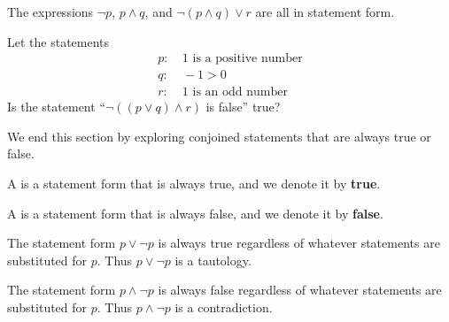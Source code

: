 \begin{example}
    The expressions $\lnot p$, $p \land q$, and $\lnot(p \land q) \lor r$ are all in statement form.
\end{example}

\begin{exercise}
    Let the statements
    \begin{align*}
        p: &\ \text{1 is a positive number}\\
        q: &\ -1 > 0\\
        r: &\ \text{1 is an odd number}
    \end{align*}
    Is the statement ``$\lnot((p\lor q)\land r)$ is false'' true?
\end{exercise}

We end this section by exploring conjoined statements that are always true or false.

\begin{definition}
    A  is a statement form that is always true, and we denote it by \textbf{true}.
\end{definition}

\begin{definition}
    A  is a statement form that is always false, and we denote it by \textbf{false}.
\end{definition}

\begin{example}
    The statement form $p \lor \lnot p$ is always true regardless of whatever statements are substituted for $p$. Thus $p \lor \lnot p$ is a tautology.
\end{example}

\begin{example}
    The statement form $p \land \lnot p$ is always false regardless of whatever statements are substituted for $p$. Thus $p \land \lnot p$ is a contradiction.
\end{example}

